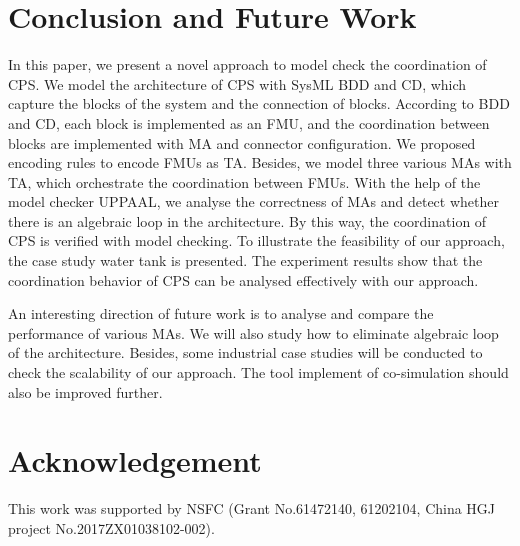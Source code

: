 \section{Conclusion and Future Work}
\label{sec:conclusion&ack}
In this paper, we present a novel approach to model check the coordination of CPS.  We model the architecture of CPS with SysML BDD and CD, which capture the blocks of the system and the connection of blocks. According to BDD and CD, each block is implemented as an FMU, and the coordination between blocks are implemented with MA and connector configuration. We proposed encoding rules to encode FMUs as TA. Besides, we model three various MAs with TA, which orchestrate the coordination between FMUs. With the help of the model checker UPPAAL, we  analyse the correctness of MAs and detect whether there is an algebraic loop in the architecture. By this way, the coordination of CPS is verified with model checking. To illustrate the feasibility of our approach, the case study water tank is presented. The experiment results show that the coordination behavior of CPS can be analysed effectively with our approach. 

An interesting direction of future work is to analyse and compare the performance of various MAs. We will also study how to eliminate algebraic loop of the architecture. Besides, some industrial case studies will be conducted to check the scalability of our approach. The tool implement of co-simulation should also be improved further.
\section*{Acknowledgement}
This work was supported by NSFC (Grant No.61472140, 61202104, China HGJ project No.2017ZX01038102-002). 



